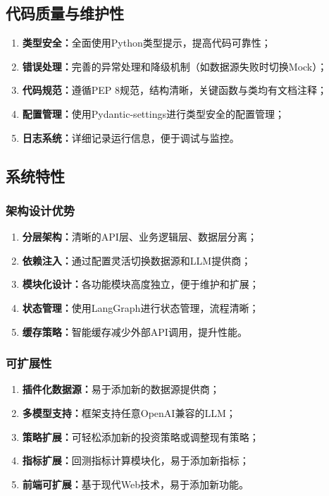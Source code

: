 \documentclass[12pt,a4paper]{ctexart}
\begin{document}
\subsection{代码质量与维护性}

\begin{enumerate}
    \item \textbf{类型安全：}全面使用Python类型提示，提高代码可靠性；
    \item \textbf{错误处理：}完善的异常处理和降级机制（如数据源失败时切换Mock）；
    \item \textbf{代码规范：}遵循PEP 8规范，结构清晰，关键函数与类均有文档注释；
    \item \textbf{配置管理：}使用Pydantic-settings进行类型安全的配置管理；
    \item \textbf{日志系统：}详细记录运行信息，便于调试与监控。
\end{enumerate}

\subsection{系统特性}

\subsubsection{架构设计优势}

\begin{enumerate}
    \item \textbf{分层架构：}清晰的API层、业务逻辑层、数据层分离；
    \item \textbf{依赖注入：}通过配置灵活切换数据源和LLM提供商；
    \item \textbf{模块化设计：}各功能模块高度独立，便于维护和扩展；
    \item \textbf{状态管理：}使用LangGraph进行状态管理，流程清晰；
    \item \textbf{缓存策略：}智能缓存减少外部API调用，提升性能。
\end{enumerate}

\subsubsection{可扩展性}

\begin{enumerate}
    \item \textbf{插件化数据源：}易于添加新的数据源提供商；
    \item \textbf{多模型支持：}框架支持任意OpenAI兼容的LLM；
    \item \textbf{策略扩展：}可轻松添加新的投资策略或调整现有策略；
    \item \textbf{指标扩展：}回测指标计算模块化，易于添加新指标；
    \item \textbf{前端可扩展：}基于现代Web技术，易于添加新功能。
\end{enumerate}
\end{document}
